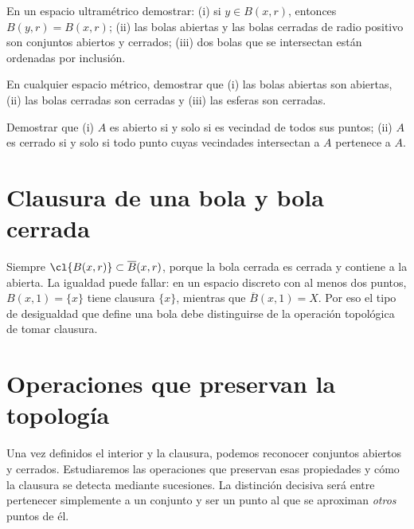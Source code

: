 \begin{ejercicio}\label{ej:lectura-2-5}
En un espacio ultramétrico demostrar: (i) si $y\in B(x,r)$, entonces $B(y,r)=B(x,r)$; (ii) las bolas abiertas y las bolas cerradas de radio positivo son conjuntos abiertos y cerrados; (iii) dos bolas que se intersectan están ordenadas por inclusión.
\end{ejercicio}


\begin{ejercicio}\label{ej:lectura-2-6}
En cualquier espacio métrico, demostrar que (i) las bolas abiertas son abiertas, (ii) las bolas cerradas son cerradas y (iii) las esferas son cerradas.
\end{ejercicio}


\begin{ejercicio}\label{ej:lectura-2-7}
Demostrar que (i) $A$ es abierto si y solo si es vecindad de todos sus puntos; (ii) $A$ es cerrado si y solo si todo punto cuyas vecindades intersectan a $A$ pertenece a $A$.
\end{ejercicio}


\section{Clausura de una bola y bola cerrada}
Siempre $\cl{B(x,r)}\subset\overline B(x,r)$, porque la bola cerrada es cerrada y contiene a la abierta. La igualdad puede fallar: en un espacio discreto con al menos dos puntos, $B(x,1)=\{x\}$ tiene clausura $\{x\}$, mientras que $\overline B(x,1)=X$. Por eso el tipo de desigualdad que define una bola debe distinguirse de la operación topológica de tomar clausura.

\section{Operaciones que preservan la topología}\label{lectura:03}
Una vez definidos el interior y la clausura, podemos reconocer conjuntos abiertos y cerrados. Estudiaremos las operaciones que preservan esas propiedades y cómo la clausura se detecta mediante sucesiones. La distinción decisiva será entre pertenecer simplemente a un conjunto y ser un punto al que se aproximan \emph{otros} puntos de él.


